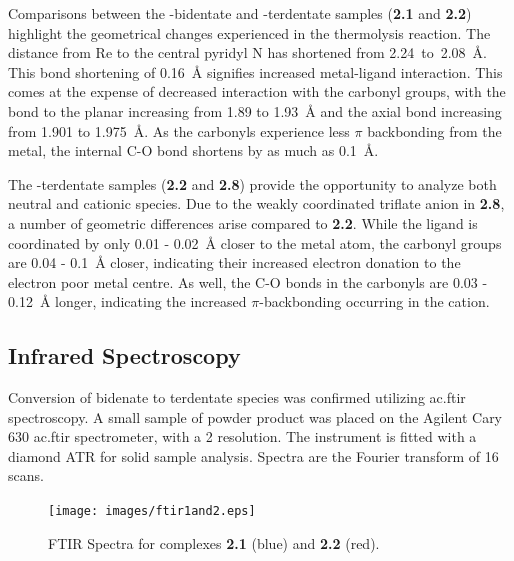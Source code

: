 Comparisons between the -bidentate and -terdentate samples (\textbf{2.1} and \textbf{2.2}) highlight the geometrical changes experienced in the thermolysis reaction. The distance from Re to the central pyridyl N has shortened from 2.24~to~2.08~\r{A}. This bond shortening of 0.16~\r{A} signifies increased metal-ligand interaction. This comes at the expense of decreased interaction with the carbonyl groups, with the bond to the planar  increasing from 1.89 to 1.93~\r{A} and the axial  bond increasing from 1.901 to 1.975~\r{A}. As the carbonyls experience less $\pi$ backbonding from the metal, the internal C-O bond shortens by as much as 0.1~\r{A}. 

The -terdentate samples (\textbf{2.2} and \textbf{2.8}) provide the opportunity to analyze both neutral and cationic species. Due to the weakly coordinated triflate anion in \textbf{2.8}, a number of geometric differences arise compared to \textbf{2.2}. While the ligand is coordinated by only 0.01 - 0.02~\r{A} closer to the metal atom, the carbonyl groups are 0.04 - 0.1~\r{A} closer, indicating their increased electron donation to the electron poor metal centre. As well, the C-O bonds in the carbonyls are 0.03 - 0.12~\r{A} longer, indicating the increased $\pi$-backbonding occurring in the cation.  





\FloatBarrier

\subsection{Infrared Spectroscopy}

Conversion of bidenate to terdentate species was confirmed utilizing \gls{ac.ftir} spectroscopy. A small sample of powder product was placed on the Agilent Cary 630 \gls{ac.ftir} spectrometer, with a 2  resolution. The instrument is fitted with a diamond ATR for solid sample analysis. Spectra are the Fourier transform of 16 scans.

\begin{figure}[!htb]
 \begin{center}
  \texttt{[image: images/ftir1and2.eps]}
 \end{center}
\caption[FTIR Spectra for complexes \textbf{2.1} and \textbf{2.2}]{FTIR Spectra for complexes \textbf{2.1} (blue) and \textbf{2.2} (red).}
\label{fig.ir1}
\end{figure} 

